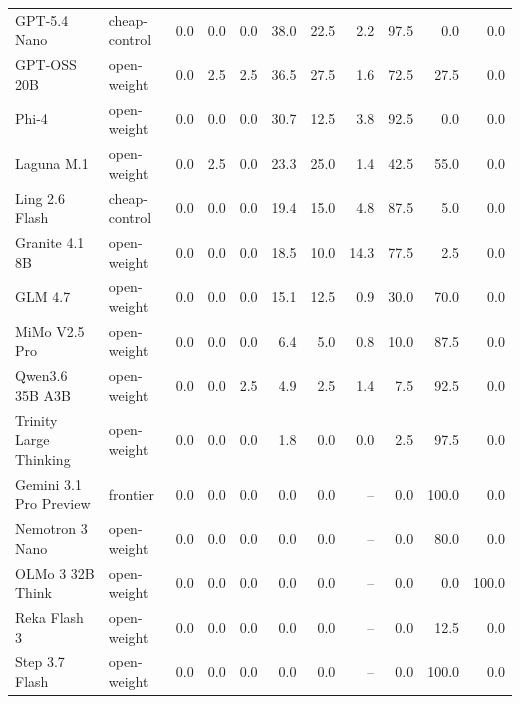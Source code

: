 \begin{longtable}{llrrrrrrrrr}
GPT-5.4 Nano & cheap-control & 0.0 & 0.0 & 0.0 & 38.0 & 22.5 & 2.2 & 97.5 & 0.0 & 0.0 \\
GPT-OSS 20B & open-weight & 0.0 & 2.5 & 2.5 & 36.5 & 27.5 & 1.6 & 72.5 & 27.5 & 0.0 \\
Phi-4 & open-weight & 0.0 & 0.0 & 0.0 & 30.7 & 12.5 & 3.8 & 92.5 & 0.0 & 0.0 \\
Laguna M.1 & open-weight & 0.0 & 2.5 & 0.0 & 23.3 & 25.0 & 1.4 & 42.5 & 55.0 & 0.0 \\
Ling 2.6 Flash & cheap-control & 0.0 & 0.0 & 0.0 & 19.4 & 15.0 & 4.8 & 87.5 & 5.0 & 0.0 \\
Granite 4.1 8B & open-weight & 0.0 & 0.0 & 0.0 & 18.5 & 10.0 & 14.3 & 77.5 & 2.5 & 0.0 \\
GLM 4.7 & open-weight & 0.0 & 0.0 & 0.0 & 15.1 & 12.5 & 0.9 & 30.0 & 70.0 & 0.0 \\
MiMo V2.5 Pro & open-weight & 0.0 & 0.0 & 0.0 & 6.4 & 5.0 & 0.8 & 10.0 & 87.5 & 0.0 \\
Qwen3.6 35B A3B & open-weight & 0.0 & 0.0 & 2.5 & 4.9 & 2.5 & 1.4 & 7.5 & 92.5 & 0.0 \\
Trinity Large Thinking & open-weight & 0.0 & 0.0 & 0.0 & 1.8 & 0.0 & 0.0 & 2.5 & 97.5 & 0.0 \\
Gemini 3.1 Pro Preview & frontier & 0.0 & 0.0 & 0.0 & 0.0 & 0.0 & -- & 0.0 & 100.0 & 0.0 \\
Nemotron 3 Nano & open-weight & 0.0 & 0.0 & 0.0 & 0.0 & 0.0 & -- & 0.0 & 80.0 & 0.0 \\
OLMo 3 32B Think & open-weight & 0.0 & 0.0 & 0.0 & 0.0 & 0.0 & -- & 0.0 & 0.0 & 100.0 \\
Reka Flash 3 & open-weight & 0.0 & 0.0 & 0.0 & 0.0 & 0.0 & -- & 0.0 & 12.5 & 0.0 \\
Step 3.7 Flash & open-weight & 0.0 & 0.0 & 0.0 & 0.0 & 0.0 & -- & 0.0 & 100.0 & 0.0 \\
\bottomrule
\end{longtable}
